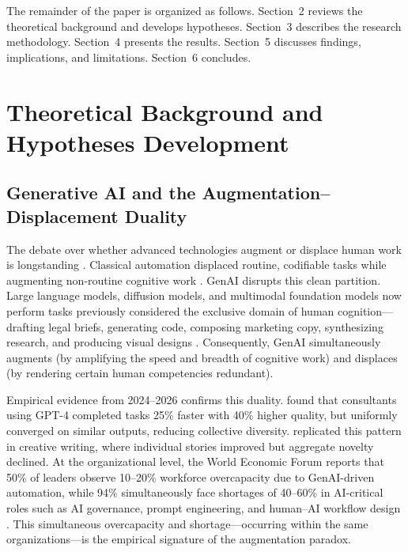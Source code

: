 \documentclass[12pt, a4paper]{article}
\begin{document}
The remainder of the paper is organized as follows. Section~2 reviews the theoretical background and develops hypotheses. Section~3 describes the research methodology. Section~4 presents the results. Section~5 discusses findings, implications, and limitations. Section~6 concludes.


\section{Theoretical Background and Hypotheses Development}

\subsection{Generative AI and the Augmentation--Displacement Duality}

The debate over whether advanced technologies augment or displace human work is longstanding \citep{Autor2015, Acemoglu2019}. Classical automation displaced routine, codifiable tasks while augmenting non-routine cognitive work \citep{Autor2003}. GenAI disrupts this clean partition. Large language models, diffusion models, and multimodal foundation models now perform tasks previously considered the exclusive domain of human cognition---drafting legal briefs, generating code, composing marketing copy, synthesizing research, and producing visual designs \citep{Eloundou2023, Noy2023}. Consequently, GenAI simultaneously augments (by amplifying the speed and breadth of cognitive work) and displaces (by rendering certain human competencies redundant).

Empirical evidence from 2024--2026 confirms this duality. \citet{DellAcqua2023} found that consultants using GPT-4 completed tasks 25\% faster with 40\% higher quality, but uniformly converged on similar outputs, reducing collective diversity. \citet{Doshi2024} replicated this pattern in creative writing, where individual stories improved but aggregate novelty declined. At the organizational level, the World Economic Forum reports that 50\% of leaders observe 10--20\% workforce overcapacity due to GenAI-driven automation, while 94\% simultaneously face shortages of 40--60\% in AI-critical roles such as AI governance, prompt engineering, and human--AI workflow design \citep{WEF2025}. This simultaneous overcapacity and shortage---occurring within the same organizations---is the empirical signature of the augmentation paradox.
\end{document}
